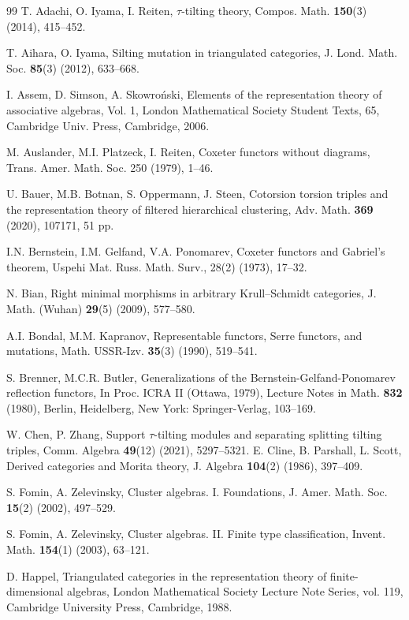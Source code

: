 \documentclass[reqno,12pt]{amsart}
\numberwithin{equation}{section}
\theoremstyle{plain}
\theoremstyle{definition}
\begin{document}
\begin{thebibliography}{99}
 T. Adachi, O. Iyama, I. Reiten, $\tau$-tilting theory, Compos. Math. {\bf 150}(3) (2014), 415--452.


 T. Aihara, O. Iyama, Silting mutation in triangulated categories, J. Lond. Math. Soc. {\bf 85}(3) (2012), 633--668.

 I. Assem, D. Simson, A. Skowro\'nski,  Elements of the representation theory of associative algebras, Vol. 1, London Mathematical Society Student Texts, 65, Cambridge Univ. Press, Cambridge, 2006.

 M. Auslander, M.I. Platzeck, I. Reiten, Coxeter functors without diagrams, Trans. Amer. Math.
Soc. 250 (1979), 1--46.


 U. Bauer, M.B. Botnan, S. Oppermann, J. Steen, Cotorsion torsion triples and the representation theory of filtered hierarchical clustering, Adv. Math. {\bf 369} (2020), 107171, 51 pp.

  I.N. Bernstein, I.M. Gelfand, V.A. Ponomarev,  Coxeter functors and Gabriel's theorem, Uspehi
Mat. Russ. Math. Surv., 28(2) (1973), 17--32.

 N. Bian, Right minimal morphisms in arbitrary Krull--Schmidt categories, J. Math. (Wuhan) {\bf 29}(5) (2009), 577--580.

 A.I. Bondal, M.M. Kapranov, Representable functors, Serre functors, and mutations, Math. USSR-Izv. {\bf 35}(3) (1990), 519--541.

 S. Brenner, M.C.R. Butler, Generalizations of the Bernstein-Gelfand-Ponomarev reflection functors,
In Proc. ICRA II (Ottawa, 1979), Lecture Notes in Math. {\bf 832} (1980), Berlin, Heidelberg, New York: Springer-Verlag, 103--169.

 W. Chen, P. Zhang, Support $\tau$-tilting modules and separating splitting tilting triples, Comm. Algebra {\bf 49}(12) (2021), 5297--5321.
 E. Cline, B. Parshall, L. Scott, Derived categories and Morita theory, J. Algebra {\bf 104}(2) (1986), 397--409.

 S. Fomin, A. Zelevinsky, Cluster algebras. I. Foundations, J. Amer. Math. Soc. {\bf 15}(2) (2002), 497--529.

 S. Fomin, A. Zelevinsky, Cluster algebras. II. Finite type classification, Invent. Math. {\bf 154}(1) (2003), 63--121.

 D. Happel, Triangulated categories in the representation theory of finite-dimensional algebras,
London Mathematical Society Lecture Note Series, vol. 119, Cambridge University Press, Cambridge, 1988.


\end{thebibliography}
\end{document}
